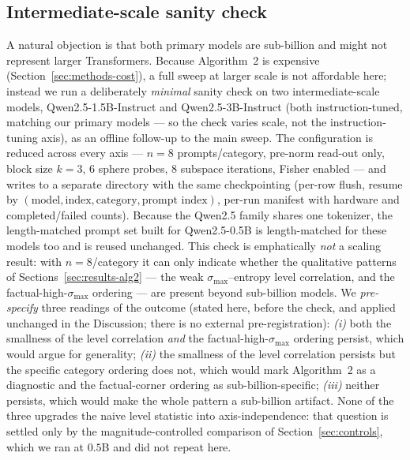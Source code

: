 \documentclass{article}
\begin{document}
\subsection{Intermediate-scale sanity check}
\label{sec:scale}
A natural objection is that both primary models are sub-billion and might not represent larger
Transformers. Because Algorithm~2 is expensive (Section~\ref{sec:methods-cost}), a full sweep at
larger scale is not affordable here; instead we run a deliberately \emph{minimal} sanity check on
two intermediate-scale models, Qwen2.5-1.5B-Instruct and Qwen2.5-3B-Instruct (both instruction-tuned,
matching our primary models --- so the check varies scale, not the instruction-tuning axis), as an offline follow-up to the main
sweep. The configuration is reduced across every axis --- $n{=}8$ prompts/category, pre-norm
read-out only, block size $k{=}3$, $6$ sphere probes, $8$ subspace iterations, Fisher enabled ---
and writes to a separate directory with the same checkpointing (per-row flush, resume by
$(\text{model},\text{index},\text{category},\text{prompt index})$, per-run manifest with hardware
and completed/failed counts). Because the Qwen2.5 family shares one tokenizer, the length-matched
prompt set built for Qwen2.5-0.5B is length-matched for these models too and is reused unchanged.
This check is emphatically \emph{not} a scaling result: with $n{=}8$/category it can only indicate
whether the qualitative patterns of Sections~\ref{sec:results-alg2} --- the weak $\sigma_{\max}$--entropy
level correlation, and the factual-high-$\sigma_{\max}$ ordering --- are present beyond sub-billion
models. We \emph{pre-specify} three readings of the outcome (stated here, before the check, and
applied unchanged in the Discussion; there is no external pre-registration):
\emph{(i)} both the smallness of the level correlation \emph{and} the factual-high-$\sigma_{\max}$
ordering persist, which would argue for generality; \emph{(ii)} the smallness of the level correlation
persists but the specific category ordering does not, which would mark Algorithm~2 as a diagnostic and
the factual-corner ordering as sub-billion-specific; \emph{(iii)} neither persists, which would make
the whole pattern a sub-billion artifact. None of the three upgrades the naive level statistic into
axis-independence: that question is settled only by the magnitude-controlled comparison of
Section~\ref{sec:controls}, which we ran at $0.5$B and did not repeat here.
\end{document}
